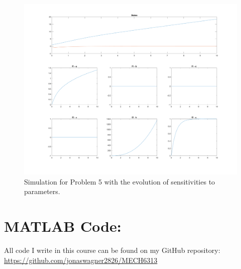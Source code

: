 \documentclass[letter]{article}
\begin{document}
\begin{figure}[h]
	\centering
	\includegraphics[width=\linewidth]{fig/pblm5}
	\caption{Simulation for Problem 5 with the evolution of sensitivities to parameters.}
	\label{fig:pblm5}
\end{figure}











\newpage
\appendix
\section{MATLAB Code:}\label{apx:matlab}
All code I write in this course can be found on my GitHub repository:\\
\href{https://github.com/jonaswagner2826/MECH6313}{https://github.com/jonaswagner2826/MECH6313}

\end{document}
